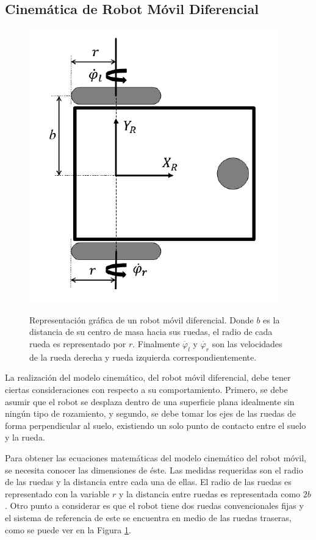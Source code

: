 \subsection{Cinemática de Robot Móvil Diferencial}
\begin{figure}%
\centering \footnotesize
{\includegraphics[width=0.40\linewidth]{images/kinematic_model.png}}
\captionsetup{font=footnotesize}
\caption{Representación gráfica de un robot móvil diferencial. Donde 
$b$ es la distancia de su centro de masa hacia sus ruedas, el radio de cada 
rueda es representado por $r$. Finalmente $\dot{\varphi_{l}}$ y 
$\dot{\varphi_{r}}$ son las velocidades de la rueda derecha y rueda izquierda 
correspondientemente.}
\label{fig:RMkinematic}
\end{figure}
La realización del modelo cinemático, del robot móvil diferencial, debe 
tener ciertas consideraciones con respecto a su comportamiento. Primero, 
se debe asumir que el robot se desplaza dentro de una superficie plana 
idealmente sin ningún tipo de rozamiento, y segundo,  se debe tomar los ejes
de las ruedas de forma perpendicular al suelo, existiendo un solo punto 
de contacto entre el suelo y la rueda.


Para obtener las ecuaciones matemáticas del modelo cinemático del robot móvil, se
necesita conocer las dimensiones de éste. Las medidas requeridas son el radio de las 
ruedas y la distancia entre cada una de ellas. El radio de las ruedas es representado
con la variable $r$ y la distancia entre ruedas es representada como $2b$. Otro punto 
a considerar es que el robot tiene dos ruedas convencionales fijas y el sistema de
referencia de este se encuentra en medio de las ruedas traseras, como se puede ver en 
la Figura \ref{fig:RMkinematic}.

